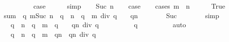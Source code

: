 \begin{isabellebody}
\ \ \isamarkupfalse%
\ {}\isanewline
\ \ \isamarkupfalse%
\ \isamarkupfalse%
\ {\isacharquery}case\isanewline
\ \ \ \ \isamarkupfalse%
\ simp\isanewline
{}\isamarkupfalse%
\isanewline
\ \ \isamarkupfalse%
\ {\isacharparenleft}Suc\ n{\isacharparenright}\isanewline
\ \ \isamarkupfalse%
\ {\isacharquery}case\isanewline
\ \ \isamarkupfalse%
\ {\isacharparenleft}cases\ {\isachardoublequoteopen}m\ {\isasymle}\ n{\isachardoublequoteclose}{\isacharparenright}\isanewline
\ \ \ \ \isamarkupfalse%
\ True\isanewline
\ \ \ \ \isamarkupfalse%
\ {\isachardoublequoteopen}sum\ {\isacharparenleft}{\isacharparenleft}{\isacharcircum}{\isacharparenright}\ q{\isacharparenright}\ {\isacharbraceleft}m{\isachardot}{\isachardot}{\isacharless}Suc\ n{\isacharbraceright}\ {\isacharequal}\ {\isacharparenleft}q\ {\isacharcircum}\ n\ {\isacharminus}\ q\ {\isacharcircum}\ m{\isacharparenright}\ div\ {\isacharparenleft}q\ {\isacharminus}\ {}{\isacharparenright}\ {\isacharplus}\ q{\isacharcircum}n{\isachardoublequoteclose}\isanewline
\ \ \ \ \ \ \isamarkupfalse%
\ Suc\isanewline
\ \ \ \ \ \ \isamarkupfalse%
\ simp\isanewline
\ \ \ \ \isamarkupfalse%
\ \isamarkupfalse%
\ {\isachardoublequoteopen}{\isachardot}{\isachardot}{\isachardot}\ {\isacharequal}\ {\isacharparenleft}{\isacharparenleft}q\ {\isacharcircum}\ n\ {\isacharminus}\ q\ {\isacharcircum}\ m{\isacharparenright}\ {\isacharplus}\ {\isacharparenleft}q\ {\isacharminus}\ {}{\isacharparenright}\ {\isacharasterisk}\ q{\isacharcircum}n{\isacharparenright}\ div\ {\isacharparenleft}q\ {\isacharminus}\ {}{\isacharparenright}{\isachardoublequoteclose}\isanewline
\ \ \ \ \ \ \isamarkupfalse%
\ {\isacharbackquoteopen}q\ {\isachargreater}\ {}{\isacharbackquoteclose}\isanewline
\ \ \ \ \ \ \isamarkupfalse%
\ auto\isanewline
\ \ \ \ \isamarkupfalse%
\ \isamarkupfalse%
\ {\isachardoublequoteopen}{\isachardot}{\isachardot}{\isachardot}\ {\isacharequal}\ {\isacharparenleft}{\isacharparenleft}q\ {\isacharcircum}\ n\ {\isacharminus}\ q\ {\isacharcircum}\ m{\isacharparenright}\ {\isacharplus}\ {\isacharparenleft}q{\isacharcircum}{\isacharparenleft}n{\isacharplus}{}{\isacharparenright}\ {\isacharminus}\ q{\isacharcircum}n{\isacharparenright}{\isacharparenright}\ div\ {\isacharparenleft}q\ {\isacharminus}\ {}{\isacharparenright}{\isachardoublequoteclose}\isanewline

\end{isabellebody}
